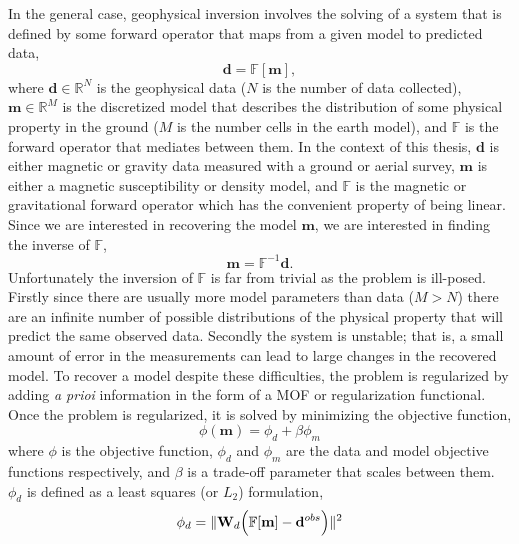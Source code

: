 In the general case, geophysical inversion involves the solving of a system that is defined by some forward operator that maps from a given model to predicted data,
\begin{equation}
\mathbf d = \mathbb F [\mathbf m],\label{eq:forwardProb}
\end{equation}
where $\mathbf d \in \mathbb R^N$ is the geophysical data ($N$ is the number of data collected),  $\mathbf m \in \mathbb R^M$ is the discretized model that describes the distribution of some physical property in the ground ($M$ is the number cells in the earth model), and $\mathbb F$ is the forward operator that mediates between them. In the context of this thesis, $\mathbf d$ is either magnetic or gravity data measured with a ground or aerial survey, $\mathbf m$ is either a magnetic susceptibility or density model, and $\mathbb F$ is the magnetic or gravitational forward operator which has the convenient property of being linear. Since we are interested in recovering the model $\mathbf m$, we are interested in finding the inverse of $\mathbb F$,
\begin{equation}
\mathbf m= \mathbb F^{-1}\mathbf d. \label{eq:inverseProb}
\end{equation}
Unfortunately the inversion of $\mathbb F$ is far from trivial as the problem is ill-posed. Firstly since there are usually more model parameters than data ($M > N$) there are an infinite number of possible distributions of the physical property that will predict the same observed data. Secondly the system is unstable; that is, a small amount of error in the measurements can lead to large changes in the recovered model. To recover a model despite these difficulties, the problem is regularized by adding \emph{a prioi} information in the form of a \ac{MOF} or regularization functional. Once the problem is regularized, it is solved by minimizing the objective function,
\begin{equation}
\phi(\mathbf m) = \phi_d + \beta \phi_m
\end{equation}
\label{eq:objectiveFunc}
where $\phi$ is the objective function, $\phi_d$ and $\phi_m$ are the data and model objective functions respectively, and $\beta$ is a trade-off parameter that scales between them. $\phi_d$ is defined as a least squares (or $L_2$) formulation,
\begin{equation}
\phi_d =\|\mathbf W_d\Big(\mathbb F [\mathbf m] - \mathbf d^{obs}\Big)\|^2\\
\end{equation}
\label{eq:phid}
